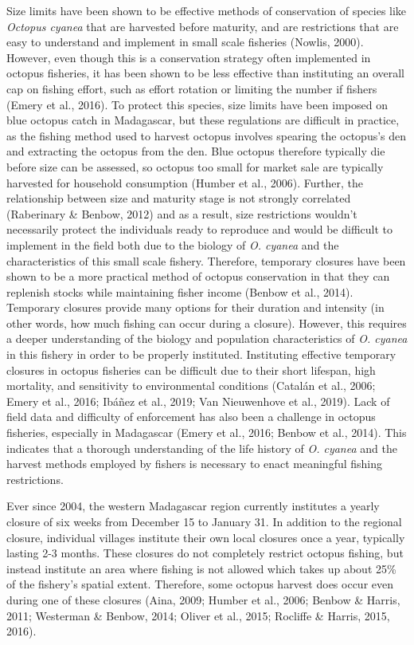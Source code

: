 \documentclass[
]{article}
\begin{document}
Size limits have been shown to be effective methods of conservation of species like \emph{Octopus cyanea} that are harvested before maturity, and are restrictions that are easy to understand and implement in small scale fisheries (Nowlis, 2000). However, even though this is a conservation strategy often implemented in octopus fisheries, it has been shown to be less effective than instituting an overall cap on fishing effort, such as effort rotation or limiting the number if fishers (Emery et al., 2016). To protect this species, size limits have been imposed on blue octopus catch in Madagascar, but these regulations are difficult in practice, as the fishing method used to harvest octopus involves spearing the octopus's den and extracting the octopus from the den. Blue octopus therefore typically die before size can be assessed, so octopus too small for market sale are typically harvested for household consumption (Humber et al., 2006). Further, the relationship between size and maturity stage is not strongly correlated (Raberinary \& Benbow, 2012) and as a result, size restrictions wouldn't necessarily protect the individuals ready to reproduce and would be difficult to implement in the field both due to the biology of \emph{O. cyanea} and the characteristics of this small scale fishery. Therefore, temporary closures have been shown to be a more practical method of octopus conservation in that they can replenish stocks while maintaining fisher income (Benbow et al., 2014). Temporary closures provide many options for their duration and intensity (in other words, how much fishing can occur during a closure). However, this requires a deeper understanding of the biology and population characteristics of \emph{O. cyanea} in this fishery in order to be properly instituted. Instituting effective temporary closures in octopus fisheries can be difficult due to their short lifespan, high mortality, and sensitivity to environmental conditions (Catalán et al., 2006; Emery et al., 2016; Ibáñez et al., 2019; Van Nieuwenhove et al., 2019). Lack of field data and difficulty of enforcement has also been a challenge in octopus fisheries, especially in Madagascar (Emery et al., 2016; Benbow et al., 2014). This indicates that a thorough understanding of the life history of \emph{O. cyanea} and the harvest methods employed by fishers is necessary to enact meaningful fishing restrictions.

Ever since 2004, the western Madagascar region currently institutes a yearly closure of six weeks from December 15 to January 31. In addition to the regional closure, individual villages institute their own local closures once a year, typically lasting 2-3 months. These closures do not completely restrict octopus fishing, but instead institute an area where fishing is not allowed which takes up about 25\% of the fishery's spatial extent. Therefore, some octopus harvest does occur even during one of these closures (Aina, 2009; Humber et al., 2006; Benbow \& Harris, 2011; Westerman \& Benbow, 2014; Oliver et al., 2015; Rocliffe \& Harris, 2015, 2016).
\end{document}
